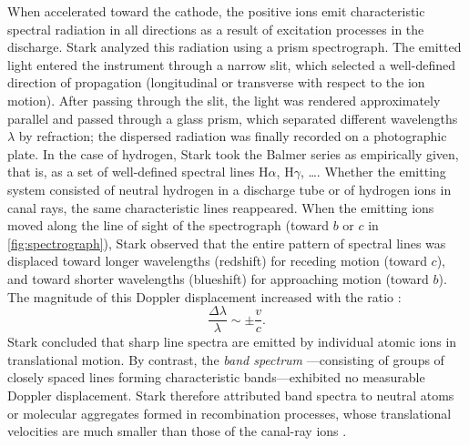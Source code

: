 \documentclass[submitted,12pt]{article}
\begin{document}
When accelerated toward the cathode, the positive ions emit characteristic spectral radiation in all directions as a result of excitation processes in the discharge. Stark analyzed this radiation using a prism spectrograph. The emitted light entered the instrument through a narrow slit, which selected a well-defined direction of propagation (longitudinal or transverse with respect to the ion motion). After passing through the slit, the light was rendered approximately parallel and passed through a glass prism, which separated different wavelengths $\lambda$ by refraction; the dispersed radiation was finally recorded on a photographic plate. In the case of hydrogen, Stark took the Balmer series as empirically given, that is, as a set of well-defined spectral lines $\mathrm{H}\alpha$, $\mathrm{H}\gamma$, \dots \citep[417]{Stark1906}. Whether the emitting system consisted of neutral hydrogen in a discharge tube or of hydrogen ions in canal rays, the same characteristic lines reappeared. When the emitting ions moved along the line of sight of the spectrograph (toward $b$ or $c$ in \cref{fig:spectrograph}), Stark observed that the entire pattern of spectral lines was displaced toward longer wavelengths (redshift) for receding motion (toward $c$), and toward shorter wavelengths (blueshift) for approaching motion (toward $b$). The magnitude of this Doppler displacement increased with the ratio \betafactorh:
%
\begin{equation*}
\frac{\Delta\lambda}{\lambda} \sim \pm \frac{v}{c}.
\end{equation*}
%
Stark concluded that sharp line spectra  are emitted by individual atomic ions in translational motion. By contrast, the \emph{band spectrum} ---consisting of groups of closely spaced lines forming characteristic bands---exhibited no measurable Doppler displacement. Stark therefore attributed band spectra to neutral atoms or molecular aggregates formed in recombination processes, whose translational velocities are much smaller than those of the canal-ray ions \citep[426]{Stark1906}.
\end{document}
